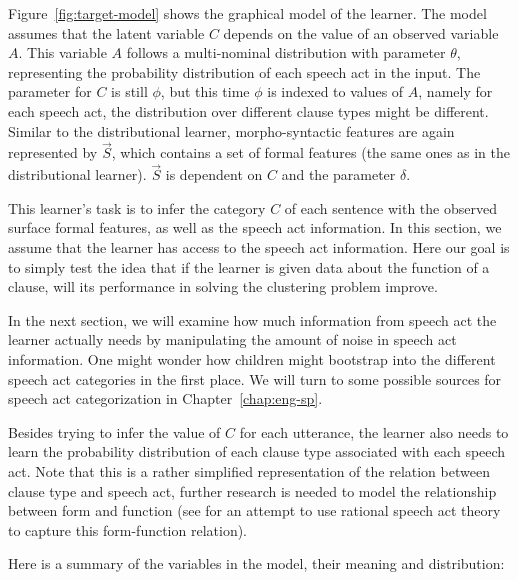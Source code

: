 Figure~\ref{fig:target-model} shows the graphical model of the learner. The model assumes that the latent variable $C$ depends on the value of an observed variable $A$. This variable $A$ follows a multi-nominal distribution with parameter $\theta$, representing the probability distribution of each speech act in the input. The parameter for $C$ is still $\phi$, but this time $\phi$ is indexed to values of $A$, namely for each speech act, the distribution over different clause types might be different. Similar to the distributional learner, morpho-syntactic features are again represented by $\vec{S}$, which contains a set of formal features (the same ones as in the distributional learner). $\vec{S}$ is dependent on $C$ and the parameter $\delta$. 

This learner's task is to infer the category $C$ of each sentence with the observed surface formal features, as well as the speech act information. In this section, we assume that the learner has access to the speech act information. Here our goal is to simply test the idea that if the learner is given data about the function of a clause, will its performance in solving the clustering problem improve.

In the next section, we will examine how much information from speech act the learner actually needs by manipulating the amount of noise in speech act information. One might wonder how children might bootstrap into the different speech act categories in the first place. We will turn to some possible sources for speech act categorization in Chapter~\ref{chap:eng-sp}.

Besides trying to infer the value of $C$ for each utterance, the learner also needs to learn the probability distribution of each clause type associated with each speech act. Note that this is a rather simplified representation of the relation between clause type and speech act, further research is needed to model the relationship between form and function (see \cite{gong2021rsaq} for an attempt to use rational speech act theory to capture this form-function relation).



Here is a summary of the variables in the model, their meaning and distribution:

